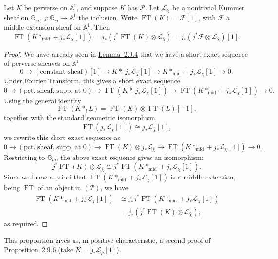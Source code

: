 Let \(K\) be perverse on \(\mathbb{A}^1\), and suppose \(K\) has
\(\mathcal{P}\). Let \(\mathcal{L}_\chi\) be a nontrivial Kummer sheaf on
\(\mathbb{G}_m\), \(j:\mathbb{G}_m\to\mathbb{A}^1\) the inclusion. Write
\(\operatorname{FT}(K)=\mathcal{F}[1]\), with \(\mathcal{F}\) a middle
extension sheaf on \(\mathbb{A}^1\). Then
\[
  \operatorname{FT}(K*_{\mathrm{mid}}+j_*\mathcal{L}_\chi[1])
  =
  j_*(j^*\operatorname{FT}(K)\otimes\mathcal{L}_{\bar{\chi}})
  =
  j_*(j^*\mathcal{F}\otimes\mathcal{L}_{\bar{\chi}})[1].
\]

\begin{proof}
We have already seen in \hyperref[lem:2.9.4]{Lemma~2.9.4} that we have a short exact sequence of perverse
sheaves on \(\mathbb{A}^1\)
\[
  0\to(\text{constant sheaf})[1]\to
  K*_!j_*\mathcal{L}_\chi[1]
  \to K*_{\mathrm{mid}}+j_*\mathcal{L}_\chi[1]\to 0.
\]
Under Fourier Transform, this gives a short exact sequence
\[
  0\to(\text{pct. sheaf, supp. at }0)
  \to\operatorname{FT}(K*_!j_*\mathcal{L}_\chi[1])
  \to\operatorname{FT}(K*_{\mathrm{mid}}+j_*\mathcal{L}_\chi[1])\to 0.
\]
Using the general identity
\[
  \operatorname{FT}(K*_!L)=\operatorname{FT}(K)\otimes\operatorname{FT}(L)[-1],
\]
together with the standard geometric isomorphism
\[
  \operatorname{FT}(j_*\mathcal{L}_\chi[1])
  \cong
  j_*\mathcal{L}_{\bar{\chi}}[1],
\]
we rewrite this short exact sequence as
\[
  0\to(\text{pct. sheaf, supp. at }0)
  \to \operatorname{FT}(K)\otimes j_*\mathcal{L}_{\bar{\chi}}
  \to \operatorname{FT}(K*_{\mathrm{mid}}+j_*\mathcal{L}_\chi[1])\to 0.
\]
Restricting to \(\mathbb{G}_m\), the above exact sequence gives an
isomorphism:
\[
  j^*\operatorname{FT}(K)\otimes\mathcal{L}_{\bar{\chi}}
  \cong
  j^*\operatorname{FT}(K*_{\mathrm{mid}}+j_*\mathcal{L}_\chi[1]).
\]
Since we know a priori that
\(\operatorname{FT}(K*_{\mathrm{mid}}+j_*\mathcal{L}_\chi[1])\) is a middle
extension, being \(\operatorname{FT}\) of an object in \((\mathcal{P})\), we
have
\[
  \begin{aligned}
    \operatorname{FT}(K*_{\mathrm{mid}}+j_*\mathcal{L}_\chi[1])
      &\cong
      j_*j^*\operatorname{FT}(K*_{\mathrm{mid}}+j_*\mathcal{L}_\chi[1])\\
      &=
      j_*(j^*\operatorname{FT}(K)\otimes\mathcal{L}_{\bar{\chi}}),
  \end{aligned}
\]
as required.
\end{proof}

This proposition gives us, in positive characteristic, a second proof of
\hyperref[prop:2.9.6]{Proposition~2.9.6} (take \(K=j_*\mathcal{L}_\rho[1]\)).

